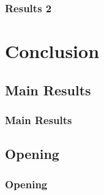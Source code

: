 \documentclass[compress,10pt, handout,sans,red]{beamer}%
\begin{document}
\begin{frame}
	\frametitle{Results 2}

\end{frame}

\section{Conclusion}
\subsection{Main Results}
\begin{frame}
	\frametitle{Main Results}

\end{frame}

\subsection{Opening}
\begin{frame}
	\frametitle{Opening}

\end{frame}
\end{document}
